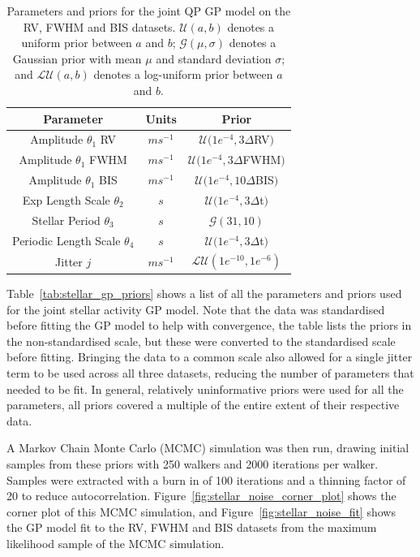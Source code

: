 \begin{table}[htb]
    \centering
    \begin{tabular}{ccc}
        \toprule
        \toprule
        Parameter & Units & Prior \\
        \midrule
        Amplitude $\theta_{1}$ RV & $ms^{-1}$ & $\mathcal{U}(1e^{-4}, 3 \Delta$RV$)$ \\
        \addlinespace
        Amplitude $\theta_{1}$ FWHM & $ms^{-1}$ & $\mathcal{U}(1e^{-4}, 3 \Delta$FWHM$)$  \\
        \addlinespace
        Amplitude $\theta_{1}$ BIS & $ms^{-1}$ & $\mathcal{U}(1e^{-4}, 10 \Delta$BIS$)$ \\
        \addlinespace
        Exp Length Scale $\theta_{2}$ & $s$ & $\mathcal{U}(1e^{-4}, 3 \Delta$t$)$ \\
        \addlinespace
        Stellar Period $\theta_{3}$ & $s$ & $\mathcal{G}(31, 10)$ \\
        \addlinespace
        Periodic Length Scale $\theta_{4}$ & $s$ & $\mathcal{U}(1e^{-4}, 3 \Delta$t$)$ \\
        \addlinespace
        Jitter $j$ & $ms^{-1}$ & $\mathcal{LU}(1e^{-10}, 1e^{-6})$ \\
        \bottomrule
    \end{tabular}
    \caption{Parameters and priors for the joint QP GP model on the RV, FWHM and BIS datasets.
    $\mathcal{U}(a, b)$ denotes a uniform prior between $a$ and $b$; $\mathcal{G}(\mu, \sigma)$ denotes a Gaussian prior
    with mean $\mu$ and standard deviation $\sigma$; and $\mathcal{LU}(a, b)$ denotes a log-uniform prior between $a$ and $b$.}
    \label{tab:stellar_gp_priors}
\end{table}

Table~\eqref{tab:stellar_gp_priors} shows a list of all the parameters and priors used for the joint stellar activity
GP model.
Note that the data was standardised before fitting the GP model to help with convergence, the table lists the priors
in the non-standardised scale, but these were converted to the standardised scale before fitting.
Bringing the data to a common scale also allowed for a single jitter term to be used across all three datasets, reducing
the number of parameters that needed to be fit.
In general, relatively uninformative priors were used for all the parameters, all priors covered a multiple of the entire
extent of their respective data.

A Markov Chain Monte Carlo (MCMC) simulation was then run, drawing initial samples from these priors with 250 walkers and
2000 iterations per walker.
Samples were extracted with a burn in of 100 iterations and a thinning factor of 20 to reduce autocorrelation.
Figure~\eqref{fig:stellar_noise_corner_plot} shows the corner plot of this MCMC simulation, and
Figure~\eqref{fig:stellar_noise_fit} shows the GP model fit to the RV, FWHM and BIS datasets from the maximum likelihood
sample of the MCMC simulation.

